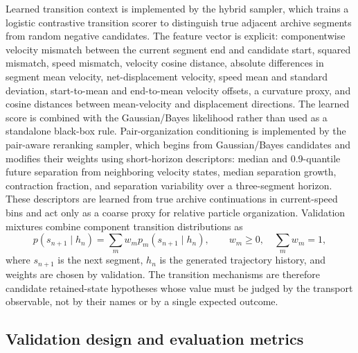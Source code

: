 \documentclass[11pt]{article}
\newcommand{\gb}{Gaussian/Bayes}
\begin{document}
Learned transition context is implemented by the hybrid sampler, which trains a logistic contrastive transition scorer to distinguish true adjacent archive segments from random negative candidates. The feature vector is explicit: componentwise velocity mismatch between the current segment end and candidate start, squared mismatch, speed mismatch, velocity cosine distance, absolute differences in segment mean velocity, net-displacement velocity, speed mean and standard deviation, start-to-mean and end-to-mean velocity offsets, a curvature proxy, and cosine distances between mean-velocity and displacement directions. The learned score is combined with the \gb{} likelihood rather than used as a standalone black-box rule. Pair-organization conditioning is implemented by the pair-aware reranking sampler, which begins from \gb{} candidates and modifies their weights using short-horizon descriptors: median and 0.9-quantile future separation from neighboring velocity states, median separation growth, contraction fraction, and separation variability over a three-segment horizon. These descriptors are learned from true archive continuations in current-speed bins and act only as a coarse proxy for relative particle organization. Validation mixtures combine component transition distributions as
\begin{equation}
  p(s_{n+1} \mid h_n) =
  \sum_m w_m p_m(s_{n+1} \mid h_n),
  \qquad
  w_m \geq 0,\quad \sum_m w_m = 1,
  \label{eq:mixture}
\end{equation}
where $s_{n+1}$ is the next segment, $h_n$ is the generated trajectory history, and weights are chosen by validation. The transition mechanisms are therefore candidate retained-state hypotheses whose value must be judged by the transport observable, not by their names or by a single expected outcome.

\subsection{Validation design and evaluation metrics}
\end{document}
